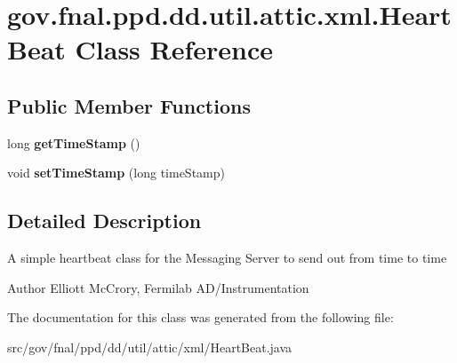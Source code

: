 \hypertarget{classgov_1_1fnal_1_1ppd_1_1dd_1_1util_1_1attic_1_1xml_1_1HeartBeat}{\section{gov.\-fnal.\-ppd.\-dd.\-util.\-attic.\-xml.\-Heart\-Beat Class Reference}
\label{classgov_1_1fnal_1_1ppd_1_1dd_1_1util_1_1attic_1_1xml_1_1HeartBeat}
}
\subsection*{Public Member Functions}
\begin{DoxyCompactItemize}
\item 
\hypertarget{classgov_1_1fnal_1_1ppd_1_1dd_1_1util_1_1attic_1_1xml_1_1HeartBeat_a49c9d3fb9db325d35fbe5363216a79a7}{long {\bfseries get\-Time\-Stamp} ()}\label{classgov_1_1fnal_1_1ppd_1_1dd_1_1util_1_1attic_1_1xml_1_1HeartBeat_a49c9d3fb9db325d35fbe5363216a79a7}

\item 
\hypertarget{classgov_1_1fnal_1_1ppd_1_1dd_1_1util_1_1attic_1_1xml_1_1HeartBeat_a6c489855f2814244d7691bc247fab9f4}{void {\bfseries set\-Time\-Stamp} (long time\-Stamp)}\label{classgov_1_1fnal_1_1ppd_1_1dd_1_1util_1_1attic_1_1xml_1_1HeartBeat_a6c489855f2814244d7691bc247fab9f4}

\end{DoxyCompactItemize}


\subsection{Detailed Description}
A simple heartbeat class for the Messaging Server to send out from time to time

\begin{DoxyAuthor}{Author}
Elliott Mc\-Crory, Fermilab A\-D/\-Instrumentation 
\end{DoxyAuthor}


The documentation for this class was generated from the following file\-:\begin{DoxyCompactItemize}
\item 
src/gov/fnal/ppd/dd/util/attic/xml/Heart\-Beat.\-java\end{DoxyCompactItemize}
